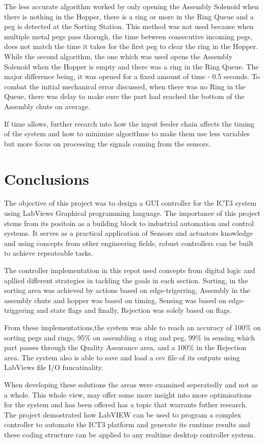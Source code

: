 \documentclass[12pt]{article}
\begin{document}
The less accurate algorithm worked by only opening the Assembly Solenoid when there is nothing in the
Hopper, there is a ring or more in the Ring Queue and a peg is detected at the Sorting Station. 
This method was not used because when multiple 
metal pegs pass thorugh, the time between consecutive incoming pegs, does not match the time it takes
for the first peg to clear the ring in the Hopper. While the second algorithm, the one which was used
opens the Assembly Solenoid when the Hopper is empty and there was a ring in the Ring Queue. The major
difference being, it was opened for a fixed amount of time - 0.5 seconds. To combat the initial mechanical
error discussed, when there was no Ring in the Queue, there was delay to make sure the part had reached
the bottom of the Assembly chute on average.

If time allows, further reearch into how the input feeder chain affects the timing of the system and how
to minimize algorithms to make them use less variables but more focus on processing the signals coming
from the sensors.

\section{Conclusions}
The objective of this project was to design a GUI controller for the ICT3 system using LabViews Graphical
programming language. The importance of this project stems from its positoin as a building block to
industrial automation and control systems. It serves as a practical application of Sensors and actuators
knowledge and using concepts from other engineering fields, robust controllers can be built to achieve
repeateable tasks.

The controller implementation in this repot used concepts from digital logic and apllied different 
strategies in tackling the goals in each section. Sorting, in the sorting area was achieved by actions 
based on edge-trigerring, Assembly in the assembly chute and hopper was based on timing, Sensing
was based on edge-triggering and state flags and finally, Rejection was solely based on flags.

From these implementations,the system was able to reach an accuracy of 100\% on
sorting pegs and rings, 95\% on assembling a ring and peg, 99\% in sensing
which part passes through the Quality Assurance area, and a 100\% in the Rejection
area. The system also is able to save and load a csv file of its outputs using LabViews
file I/O funcatinality.

When developing these solutions the areas were examined seperatedly and not as a whole. This whole view,
may offer some more insight into more optimisations for the system and has been offered has a topic that
warrants futher research. The project demostrated how LabVIEW can be used to program a 
complex controller to automate the ICT3 platform and generate its runtime results and these coding structure
can be applied to any realtime desktop controller system.

\clearpage


\end{document}
